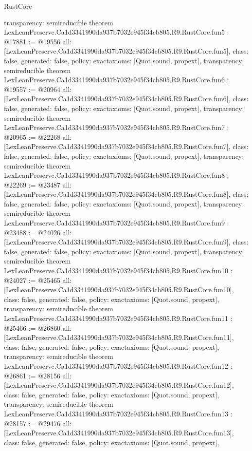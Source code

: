 \begin{lexlean}{RustCore}
\begin{coremodule}
{  transparency: semireducible
}
theorem LexLeanPreserve.Ca1d3341990da937b7032e945f34cb805.R9.RustCore.fun5 : @17881 := @19556 {
  all: [LexLeanPreserve.Ca1d3341990da937b7032e945f34cb805.R9.RustCore.fun5],
  class: false,
  generated: false,
  policy: exact{axioms: [Quot.sound, propext]},
  transparency: semireducible
}
theorem LexLeanPreserve.Ca1d3341990da937b7032e945f34cb805.R9.RustCore.fun6 : @19557 := @20964 {
  all: [LexLeanPreserve.Ca1d3341990da937b7032e945f34cb805.R9.RustCore.fun6],
  class: false,
  generated: false,
  policy: exact{axioms: [Quot.sound, propext]},
  transparency: semireducible
}
theorem LexLeanPreserve.Ca1d3341990da937b7032e945f34cb805.R9.RustCore.fun7 : @20965 := @22268 {
  all: [LexLeanPreserve.Ca1d3341990da937b7032e945f34cb805.R9.RustCore.fun7],
  class: false,
  generated: false,
  policy: exact{axioms: [Quot.sound, propext]},
  transparency: semireducible
}
theorem LexLeanPreserve.Ca1d3341990da937b7032e945f34cb805.R9.RustCore.fun8 : @22269 := @23487 {
  all: [LexLeanPreserve.Ca1d3341990da937b7032e945f34cb805.R9.RustCore.fun8],
  class: false,
  generated: false,
  policy: exact{axioms: [Quot.sound, propext]},
  transparency: semireducible
}
theorem LexLeanPreserve.Ca1d3341990da937b7032e945f34cb805.R9.RustCore.fun9 : @23488 := @24026 {
  all: [LexLeanPreserve.Ca1d3341990da937b7032e945f34cb805.R9.RustCore.fun9],
  class: false,
  generated: false,
  policy: exact{axioms: [Quot.sound, propext]},
  transparency: semireducible
}
theorem LexLeanPreserve.Ca1d3341990da937b7032e945f34cb805.R9.RustCore.fun10 : @24027 := @25465 {
  all: [LexLeanPreserve.Ca1d3341990da937b7032e945f34cb805.R9.RustCore.fun10],
  class: false,
  generated: false,
  policy: exact{axioms: [Quot.sound, propext]},
  transparency: semireducible
}
theorem LexLeanPreserve.Ca1d3341990da937b7032e945f34cb805.R9.RustCore.fun11 : @25466 := @26860 {
  all: [LexLeanPreserve.Ca1d3341990da937b7032e945f34cb805.R9.RustCore.fun11],
  class: false,
  generated: false,
  policy: exact{axioms: [Quot.sound, propext]},
  transparency: semireducible
}
theorem LexLeanPreserve.Ca1d3341990da937b7032e945f34cb805.R9.RustCore.fun12 : @26861 := @28156 {
  all: [LexLeanPreserve.Ca1d3341990da937b7032e945f34cb805.R9.RustCore.fun12],
  class: false,
  generated: false,
  policy: exact{axioms: [Quot.sound, propext]},
  transparency: semireducible
}
theorem LexLeanPreserve.Ca1d3341990da937b7032e945f34cb805.R9.RustCore.fun13 : @28157 := @29476 {
  all: [LexLeanPreserve.Ca1d3341990da937b7032e945f34cb805.R9.RustCore.fun13],
  class: false,
  generated: false,
  policy: exact{axioms: [Quot.sound, propext]},
}
\end{coremodule}
\end{lexlean}
